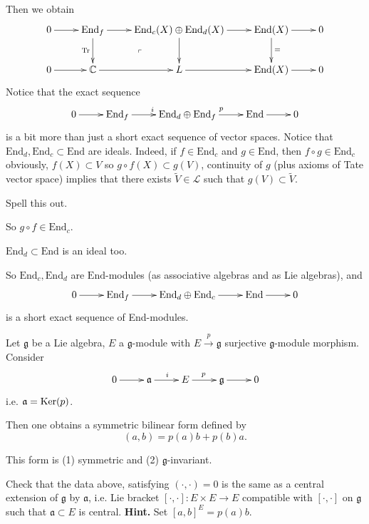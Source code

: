 Then we obtain
$$
\xymatrix{
0\ar[r]&\text{End}_f\ar[r]\ar[d]_{\text{Tr}}\ar@{}[dr]|-{\ulcorner}&
\text{End}_c(X) \oplus \text{End}_d(X)\ar[d]\ar[r]&
\text{End}(X)\ar[r]\ar[d]^{=}&0\\
0 \ar[r]&\mathbb{C}\ar[r]& L\ar[r]& \text{End}(X)\ar[r]&0
}
$$
\medskip\noindent
Notice that the exact sequence
$$
\xymatrix{
0\ar[r]&\text{End}_f\ar[r]^i
&\text{End}_d \oplus \text{End}_f\ar[r]^p
&\text{End}\ar[r]&0
}
$$
is a bit more than 
just a short exact sequence of vector spaces.
Notice that $\text{End}_d,\text{End}_c \subset \text{End}$
are ideals.
Indeed,
if $f \in \text{End}_c$ and $g \in \text{End}$,
then $f \circ g \in \text{End}_c$ obviously,
$f(X) \subset V$ so $g \circ f (X) \subset g(V)$,
continuity of $g$
(plus axioms of Tate vector space)
implies that there exists $\widetilde{V} \in \mathcal{L}$
such that $g(V) \subset \widetilde{V}$.

\begin{exercise}
\label{exercise-spell-this-out}
Spell this out.
\end{exercise}

So $g \circ f \in \text{End}_c$.

\begin{exercise}
\label{exercise-ideal-too}
$\text{End}_d \subset \text{End}$ is an ideal too.
\end{exercise}

So $\text{End}_c, \text{End}_d$ are $\text{End}$-modules
(as associative algebras and as Lie algebras),
and
$$
\xymatrix{
0\ar[r]&\text{End}_f\ar[r]&\text{End}_d \oplus \text{End}_c\ar[r]&
\text{End}\ar[r]&0
}
$$
is a short exact sequence of End-modules.

\medskip\noindent
Let $\mathfrak{g}$ be a Lie algebra, $E$ a $\mathfrak{g}$-module
with $E \xrightarrow{p}\mathfrak{g}$ surjective
$\mathfrak{g}$-module morphism.
Consider
$$
\xymatrix{
0\ar[r]&\mathfrak{a}\ar[r]^i&E\ar[r]^p&\mathfrak{g}\ar[r]&0
}
$$
i.e. $\mathfrak{a}=\mathop{\mathrm{Ker}}(p)$.

Then one obtains a symmetric bilinear form
defined by
$$
(a,b)=p(a)b+p(b)a.
$$
\begin{exercise}
\label{exercise-bilinear-form-extension}
This form is (1) symmetric and 
(2) $\mathfrak{g}$-invariant.
\end{exercise}

\begin{exercise}
\label{exercise-central-extension}
Check that the data above,
satisfying $(\cdot,\cdot)=0$
is the same as a central extension of $\mathfrak{g}$ 
by $\mathfrak{a}$,
i.e. Lie bracket $[\cdot,\cdot]:E \times E \to E$
compatible with $[\cdot,\cdot]$ on $\mathfrak{g}$ 
such that $\mathfrak{a}\subset E$
is central.
{\bf Hint.} Set $[a,b]^E=p(a)b$.
\end{exercise}

